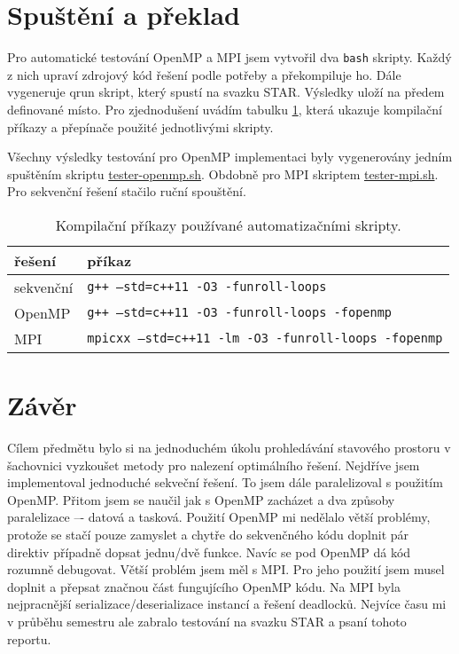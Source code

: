 \documentclass{article}
\newcommand{\const}[1]{\texttt{#1}}
\begin{document}
    \pagebreak
    \section{Spuštění a překlad}
    Pro automatické testování OpenMP a MPI jsem vytvořil dva \verb|bash| skripty. Každý z nich upraví zdrojový kód řešení
    podle potřeby a překompiluje ho. Dále vygeneruje qrun skript, který spustí na svazku STAR. Výsledky uloží na
    předem definované místo. Pro zjednodušení uvádím tabulku \ref{tab:compilation-short}, která ukazuje kompilační příkazy a přepínače
    použité jednotlivými skripty.

    Všechny výsledky testování pro OpenMP implementaci byly vygenerovány jedním spuštěním skriptu
    \href{https://github.com/TaIos/ni-pdp-vysledky-mereni-star/blob/master/openmp/tester-openmp.sh}{tester-openmp.sh}.
    Obdobně pro MPI skriptem \href{https://github.com/TaIos/ni-pdp-vysledky-mereni-star/blob/master/mpi/tester-mpi.sh}{tester-mpi.sh}.
    Pro sekvenční řešení stačilo ruční spouštění.

    \begin{table}[ht]
        \centering
        \begin{tabular}{|l|l|}
            \hline
            \textbf{řešení}    & \textbf{příkaz}                                      \\ \hline
            sekvenční & \const{g++ --std=c++11 -O3 -funroll-loops}          \\ \hline
            OpenMP    & \const{g++ --std=c++11 -O3 -funroll-loops -fopenmp} \\ \hline
            MPI       & \const{mpicxx --std=c++11 -lm -O3 -funroll-loops -fopenmp}   \\ \hline
        \end{tabular}
        \caption{Kompilační příkazy používané automatizačními skripty.}
        \label{tab:compilation-short}
    \end{table}

    \section{Závěr}

    Cílem předmětu bylo si na jednoduchém úkolu prohledávání stavového prostoru v šachovnici vyzkoušet metody pro
    nalezení optimálního řešení. Nejdříve jsem implementoval jednoduché sekveční řešení. To jsem dále paralelizoval
    s použitím OpenMP. Přitom jsem se naučil jak s OpenMP zacházet a dva způsoby paralelizace –- datová a tasková.
    Použití OpenMP mi nedělalo větší problémy, protože se stačí pouze zamyslet a chytře do sekvenčného kódu doplnit
    pár direktiv případně dopsat jednu/dvě funkce. Navíc se pod OpenMP dá kód rozumně debugovat. Větší problém jsem
    měl s MPI. Pro jeho použití jsem musel doplnit a přepsat značnou část fungujícího OpenMP kódu. Na MPI byla
    nejpracnější serializace/deserializace instancí a řešení deadlocků. Nejvíce času mi v průběhu semestru ale zabralo
    testování na svazku STAR a psaní tohoto reportu.
\end{document}
